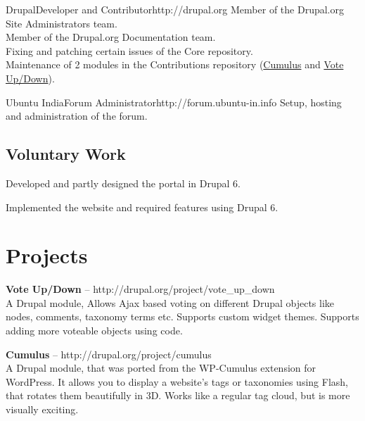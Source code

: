 \documentclass[11pt,a4paper]{moderncv}
\begin{document}
{Drupal}{Developer and Contributor}{}{http://drupal.org}
{Member of the Drupal.org Site Administrators team.
\\Member of the Drupal.org Documentation team.
\\Fixing and patching certain issues of the Core repository.
\\Maintenance of 2 modules in the Contributions repository (\href{htp://drupal.org/project/cumulus}{Cumulus} and \href{http://drupal.org/project/vote_up_down}{Vote Up/Down}).}

{Ubuntu India}{Forum Administrator}{}{http://forum.ubuntu-in.info}
{Setup, hosting and administration of the forum.}

\subsection{Voluntary Work}

{Developed and partly designed the portal in Drupal 6.}

{Implemented the website and required features using Drupal 6.}



\pagebreak
\section{Projects}

\cvlistitem
{\textbf{Vote Up/Down} -- {\small http://drupal.org/project/vote\_up\_down}
\\A Drupal module, Allows Ajax based voting on different Drupal objects like nodes, comments, taxonomy terms etc. Supports custom widget themes. Supports adding more voteable objects using code.\\
}

\cvlistitem
{\textbf{Cumulus} -- {\small http://drupal.org/project/cumulus}
\\A Drupal module, that was ported from the WP-Cumulus extension for WordPress. It allows you to display a website's tags or taxonomies using Flash, that rotates them beautifully in 3D. Works like a regular tag cloud, but is more visually exciting.\\
}
\end{document}
